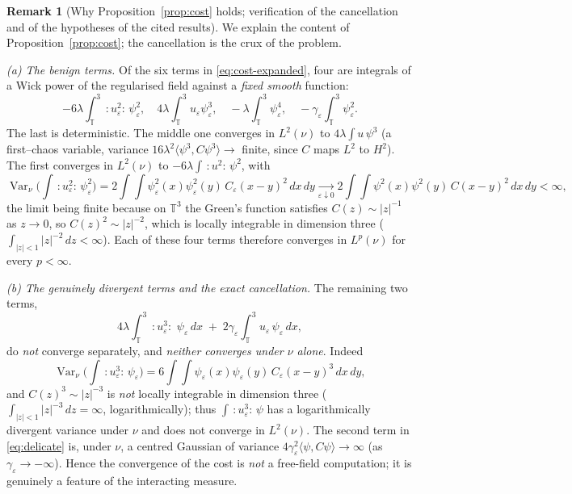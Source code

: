 \documentclass[12pt]{article}
\theoremstyle{definition}
\newtheorem{remark}{Remark}
\newcommand{\T}{\mathbb{T}^3}
\newcommand{\Wick}[1]{\,{:}#1{:}\,}
\DeclareMathOperator{\Var}{Var}
\begin{document}
\begin{remark}[Why Proposition~\ref{prop:cost} holds; verification of the cancellation and
of the hypotheses of the cited results]\label{rem:cost}
We explain the content of Proposition~\ref{prop:cost}; the cancellation is the crux of the
problem.

\emph{(a) The benign terms.} Of the six terms in \eqref{eq:cost-expanded}, four are
integrals of a Wick power of the regularised field against a \emph{fixed smooth} function:
\[
  -6\lambda\!\int_\T\Wick{u_\varepsilon^2}\psi_\varepsilon^2,\quad
   4\lambda\!\int_\T u_\varepsilon\psi_\varepsilon^3,\quad
  -\lambda\!\int_\T\psi_\varepsilon^4,\quad
  -\gamma_\varepsilon\!\int_\T\psi_\varepsilon^2 .
\]
The last is deterministic. The middle one converges in $L^2(\nu)$ to
$4\lambda\int u\,\psi^3$ (a first--chaos variable, variance
$16\lambda^2\langle\psi^3,C\psi^3\rangle\to$ finite, since $C$ maps $L^2$ to $H^2$). The
first converges in $L^2(\nu)$ to $-6\lambda\int\Wick{u^2}\psi^2$, with
\[
  \Var_\nu\!\Big(\!\int\Wick{u_\varepsilon^2}\psi_\varepsilon^2\Big)
   =2\!\int\!\!\int\psi_\varepsilon^2(x)\psi_\varepsilon^2(y)\,C_\varepsilon(x-y)^2\,dx\,dy
   \xrightarrow[\varepsilon\downarrow0]{}
   2\!\int\!\!\int\psi^2(x)\psi^2(y)\,C(x-y)^2\,dx\,dy<\infty,
\]
the limit being finite because on $\T$ the Green's function satisfies
$C(z)\sim|z|^{-1}$ as $z\to0$, so $C(z)^2\sim|z|^{-2}$, which is locally integrable in
dimension three ($\int_{|z|<1}|z|^{-2}\,dz<\infty$). Each of these four terms therefore
converges in $L^p(\nu)$ for every $p<\infty$.

\emph{(b) The genuinely divergent terms and the exact cancellation.} The remaining two
terms,
\begin{equation}\label{eq:delicate}
  4\lambda\!\int_\T\Wick{u_\varepsilon^3}\,\psi_\varepsilon\,dx
  \;+\;
  2\gamma_\varepsilon\!\int_\T u_\varepsilon\,\psi_\varepsilon\,dx ,
\end{equation}
do \emph{not} converge separately, and \emph{neither converges under $\nu$ alone}. Indeed
\[
  \Var_\nu\!\Big(\!\int\Wick{u_\varepsilon^3}\psi_\varepsilon\Big)
   =6\!\int\!\!\int\psi_\varepsilon(x)\psi_\varepsilon(y)\,C_\varepsilon(x-y)^3\,dx\,dy,
\]
and $C(z)^3\sim|z|^{-3}$ is \emph{not} locally integrable in dimension three
($\int_{|z|<1}|z|^{-3}\,dz=\infty$, logarithmically); thus $\int\Wick{u_\varepsilon^3}\psi$
has a logarithmically divergent variance under $\nu$ and does not converge in $L^2(\nu)$.
The second term in \eqref{eq:delicate} is, under $\nu$, a centred Gaussian of variance
$4\gamma_\varepsilon^2\langle\psi,C\psi\rangle\to\infty$ (as $\gamma_\varepsilon\to-\infty$).
Hence the convergence of the cost is \emph{not} a free-field computation; it is genuinely a
feature of the interacting measure.


\end{remark}
\end{document}
